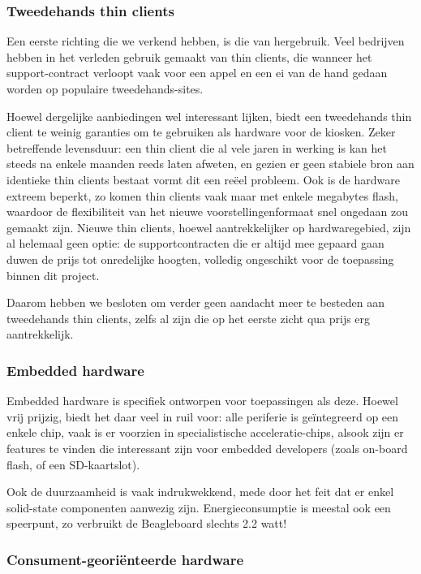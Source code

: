 \subsubsection{Tweedehands thin clients}

Een eerste richting die we verkend hebben, is die van hergebruik. Veel bedrijven hebben in het verleden gebruik gemaakt van thin clients, die wanneer het support-contract verloopt vaak voor een appel en een ei van de hand gedaan worden op populaire tweedehands-sites.

Hoewel dergelijke aanbiedingen wel interessant lijken, biedt een tweedehands thin client te weinig garanties om te gebruiken als hardware voor de kiosken. Zeker betreffende levensduur: een thin client die al vele jaren in werking is kan het steeds na enkele maanden reeds laten afweten, en gezien er geen stabiele bron aan identieke thin clients bestaat vormt dit een reëel probleem. Ook is de hardware extreem beperkt, zo komen thin clients vaak maar met enkele megabytes flash, waardoor de flexibiliteit van het nieuwe voorstellingenformaat snel ongedaan zou gemaakt zijn. Nieuwe thin clients, hoewel aantrekkelijker op hardwaregebied, zijn al helemaal geen optie: de supportcontracten die er altijd mee gepaard gaan duwen de prijs tot onredelijke hoogten, volledig ongeschikt voor de toepassing binnen dit project.

Daarom hebben we besloten om verder geen aandacht meer te besteden aan tweedehands thin clients, zelfs al zijn die op het eerste zicht qua prijs erg aantrekkelijk.

\subsubsection{Embedded hardware}

Embedded hardware is specifiek ontworpen voor toepassingen als deze. Hoewel vrij prijzig, biedt het daar veel in ruil voor: alle periferie is geïntegreerd op een enkele chip, vaak is er voorzien in specialistische acceleratie-chips, alsook zijn er features te vinden die interessant zijn voor embedded developers (zoals on-board flash, of een SD-kaartslot).

Ook de duurzaamheid is vaak indrukwekkend, mede door het feit dat er enkel solid-state componenten aanwezig zijn. Energieconsumptie is meestal ook een speerpunt, zo verbruikt de Beagleboard slechts 2.2 watt!

\subsubsection{Consument-georiënteerde hardware}

